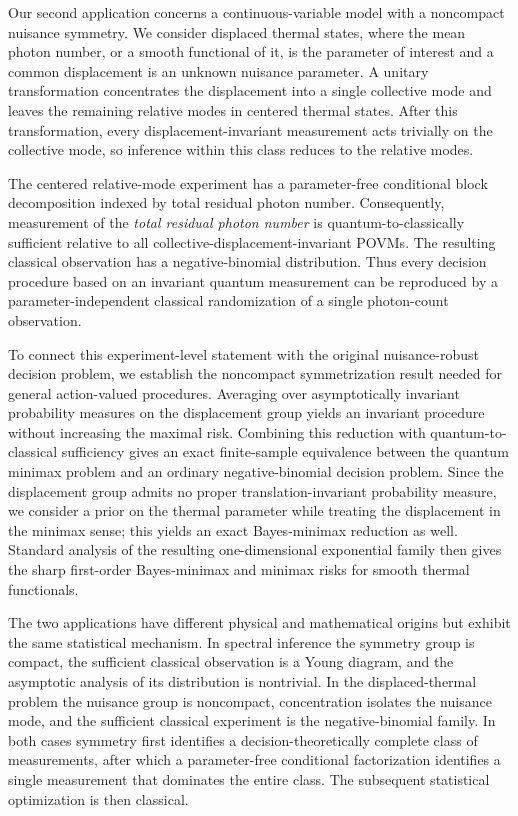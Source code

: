 \documentclass{article}
\theoremstyle{named}
\theoremstyle{named1}
\theoremstyle{plain}
\theoremstyle{remark}
\begin{document}
Our second application concerns a continuous-variable model with a
noncompact nuisance symmetry. We consider displaced thermal states, where
the mean photon number, or a smooth functional of it, is the parameter of
interest and a common displacement is an unknown nuisance parameter. A unitary transformation concentrates the displacement into a single
collective mode and leaves the remaining relative modes in centered thermal
states. After this transformation, every displacement-invariant measurement acts
trivially on the collective mode, so inference within this class reduces
to the relative modes.

The centered relative-mode experiment has a parameter-free conditional block
decomposition indexed by total residual photon number. Consequently, measurement of
the \emph{total residual photon number} is quantum-to-classically sufficient
relative to all collective-displacement-invariant POVMs. The resulting
classical observation has a negative-binomial distribution. Thus every
decision procedure based on an invariant quantum measurement can
be reproduced by a parameter-independent classical randomization of a single
photon-count observation.

To connect this experiment-level statement with the original nuisance-robust
decision problem, we establish the noncompact symmetrization result needed
for general action-valued procedures.
Averaging over asymptotically invariant
probability measures on the displacement group yields an invariant procedure
without increasing the maximal risk. Combining this reduction with
quantum-to-classical sufficiency gives an exact finite-sample equivalence
between the quantum minimax problem and an ordinary negative-binomial
decision problem. Since the displacement group admits no proper
translation-invariant probability measure, we consider a prior on the thermal parameter while treating the
displacement in the minimax sense; this yields an exact Bayes-minimax
reduction as well. Standard analysis of the resulting one-dimensional
exponential family then gives the sharp first-order Bayes-minimax and
minimax risks for smooth thermal functionals.

The two applications have different physical and mathematical origins but
exhibit the same statistical mechanism. In spectral inference the symmetry
group is compact, the sufficient classical observation is a Young diagram,
and the asymptotic analysis of its distribution is nontrivial. In the
displaced-thermal problem the nuisance group is noncompact, concentration
isolates the nuisance mode, and the sufficient classical experiment is the negative-binomial family. In both cases symmetry first identifies
a decision-theoretically complete class of measurements, after which a
parameter-free conditional factorization identifies a single measurement
that dominates the entire class. The subsequent statistical optimization is
then classical.
\end{document}
